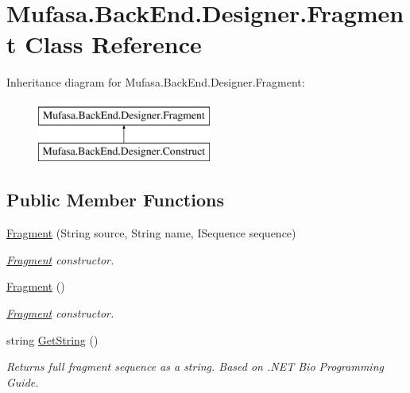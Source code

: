 \hypertarget{class_mufasa_1_1_back_end_1_1_designer_1_1_fragment}{\section{Mufasa.\+Back\+End.\+Designer.\+Fragment Class Reference}
\label{class_mufasa_1_1_back_end_1_1_designer_1_1_fragment}
}
Inheritance diagram for Mufasa.\+Back\+End.\+Designer.\+Fragment\+:\begin{figure}[H]
\begin{center}
\leavevmode
\includegraphics[height=2.000000cm]{class_mufasa_1_1_back_end_1_1_designer_1_1_fragment}
\end{center}
\end{figure}
\subsection*{Public Member Functions}
\begin{DoxyCompactItemize}
\item 
\hyperlink{class_mufasa_1_1_back_end_1_1_designer_1_1_fragment_a7191c82138fdc0a3ad5f69e3ae38001d}{Fragment} (String source, String name, I\+Sequence sequence)
\begin{DoxyCompactList}\small\item\em \hyperlink{class_mufasa_1_1_back_end_1_1_designer_1_1_fragment}{Fragment} constructor. \end{DoxyCompactList}\item 
\hyperlink{class_mufasa_1_1_back_end_1_1_designer_1_1_fragment_ae923865108b88784fc114f45615bf790}{Fragment} ()
\begin{DoxyCompactList}\small\item\em \hyperlink{class_mufasa_1_1_back_end_1_1_designer_1_1_fragment}{Fragment} constructor. \end{DoxyCompactList}\item 
string \hyperlink{class_mufasa_1_1_back_end_1_1_designer_1_1_fragment_a65a70dc39a041c6edfce70f40e741b14}{Get\+String} ()
\begin{DoxyCompactList}\small\item\em Returns full fragment sequence as a string. Based on .N\+E\+T Bio Programming Guide. \end{DoxyCompactList}\end{DoxyCompactItemize}
